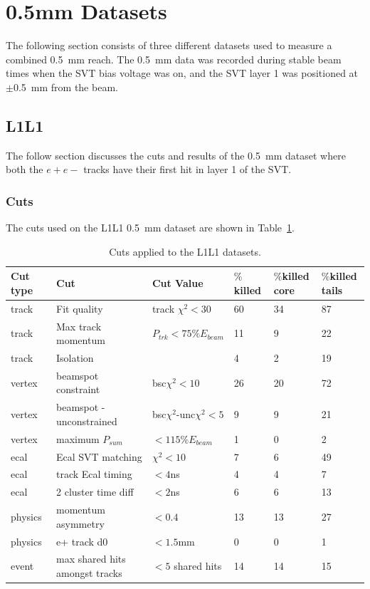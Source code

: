 \documentclass[twoside]{article}
\begin{document}
\section{0.5mm Datasets}

The following section consists of three different datasets used to measure a combined 0.5~mm reach. The 0.5~mm data was recorded during stable beam times when the SVT bias voltage was on, and the SVT layer 1 was positioned at $\pm$0.5~mm from the beam. 

\subsection{L1L1}

The follow section discusses the cuts and results of the 0.5~mm dataset where both the $e+e-$ tracks have their first hit in layer 1 of the SVT. 

\subsubsection{Cuts}
The cuts used on the L1L1 0.5~mm dataset are shown in Table~\ref{tab:l1l1_cuts}.

\begin{table}[H]
\caption{Cuts applied to the L1L1 datasets.}
\label{tab:l1l1_cuts}
\centering
\begin{tabular}{llllll}
\toprule
Cut type & Cut & Cut Value &  $\%$killed &  $\%$killed core & $\%$killed tails\\
\midrule
track & Fit quality & track $\chi^{2}<30$ & 60 & 34 & 87 \\
track & Max track momentum &  $P_{trk}<75\%E_{beam}$ & 11 & 9 & 22 \\
track & Isolation &   & 4 & 2 & 19 \\
vertex & beamspot constraint & bsc$\chi^{2}<10$  & 26 & 20 & 72 \\
vertex & beamspot - unconstrained & bsc$\chi^{2}$-unc$\chi^2<5$  & 9 & 9 & 21 \\
vertex & maximum $P_{sum}$ &  $<115\%E_{beam}$ & 1 & 0 & 2 \\
ecal & Ecal SVT matching & $\chi^2<10$  & 7 & 6 & 49 \\
ecal & track Ecal timing & $<4$ns  & 4 & 4 & 7 \\
ecal & 2 cluster time diff & $<2$ns  & 6 & 6 & 13 \\
physics & momentum asymmetry & $<0.4$  & 13 & 13 & 27 \\
physics & e+ track d0 & $<1.5$mm  & 0 & 0 & 1 \\
event & max shared hits amongst tracks & $<5$ shared hits  & 14 & 14 & 15 \\
\bottomrule
\end{tabular}
\end{table}
\end{document}
